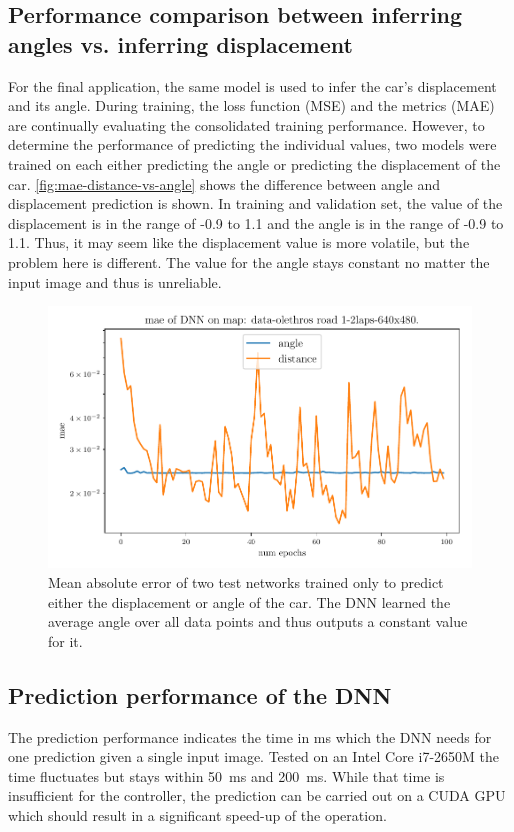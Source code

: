 \documentclass[10pt,a4paper,twoside,journal]{IEEEtran}
\begin{document}
\subsection{Performance comparison between inferring angles vs. inferring displacement}
For the final application, the same model is used to infer the car's displacement and its angle. During training, the loss function (MSE) and the metrics (MAE) are continually evaluating the consolidated training performance. However, to determine the performance of predicting the individual values, two models were trained on each either predicting the angle or predicting the displacement of the car. \autoref{fig:mae-distance-vs-angle} shows the difference between angle and displacement prediction is shown. In training and validation set, the value of the displacement is in the range of -0.9 to 1.1 and the angle is in the range of -0.9 to 1.1. Thus, it may seem like the displacement value is more volatile, but the problem here is different. The value for the angle stays constant no matter the input image and thus is unreliable. 

\begin{figure}[ht]
	\centering
	\includegraphics[width=\columnwidth]{attachments/alexnet-val_mae-angle_dist_comp-05425-86589.pdf}
	\caption{Mean absolute error of two test networks trained only to predict either the displacement or angle of the car. The DNN learned the average angle over all data points and thus outputs a constant value for it.}
	\label{fig:mae-distance-vs-angle}
\end{figure}

\subsection{Prediction performance of the DNN}
The prediction performance indicates the time in ms which the DNN needs for one prediction given a single input image. Tested on an Intel Core i7-2650M the time fluctuates but stays within \SI{50}{\milli\second} and \SI{200}{\milli\second}. While that time is insufficient for the controller, the prediction can be carried out on a CUDA GPU which should result in a significant speed-up of the operation.
\end{document}
